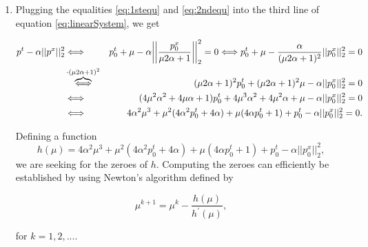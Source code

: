         \begin{enumerate}
            \item Plugging the equalities \ref{eq:1stequ} and \ref{eq:2ndequ} into the third line of equation \ref{eq:linearSystem}, we get

        \begin{eqnarray}
            p^{t} - \alpha||p^{x}||_{2}^{2} &\Longleftrightarrow& p_{0}^{t} + \mu - \alpha \bigg|\bigg|\frac{p_{0}^{x}}{\mu 2 \alpha + 1}\bigg|\bigg|_{2}^{2} = 0 \Longleftrightarrow p_{0}^{t} + \mu - \frac{\alpha}{(\mu 2 \alpha + 1)^{2}} ||p_{0}^{x}||_{2}^{2} = 0 \notag \\
            &\overbrace{\Longleftrightarrow}^{\cdot (\mu2\alpha + 1)^{2}}& (\mu 2 \alpha + 1)^{2} p_{0}^{t} + (\mu 2 \alpha + 1)^{2} \mu - \alpha ||p_{0}^{x}||_{2}^{2} = 0 \notag \\
            &\Longleftrightarrow& (4 \mu^{2} \alpha^{2} + 4 \mu \alpha + 1) p_{0}^{t} + 4 \mu^{3} \alpha^{2} + 4 \mu^{2} \alpha + \mu - \alpha ||p_{0}^{x}||_{2}^{2} = 0 \notag \\
            &\Longleftrightarrow& 4 \alpha^{2} \mu^{3} + \mu^{2} (4 \alpha^{2} p_{0}^{t} + 4 \alpha) + \mu (4 \alpha p_{0}^{t} + 1) + p_{0}^{t} - \alpha ||p_{0}^{x}||_{2}^{2} = 0. \notag
        \end{eqnarray}

        Defining a function
            $$
                h(\mu) = 4 \alpha^{2} \mu^{3} + \mu^{2} (4 \alpha^{2} p_{0}^{t} + 4 \alpha) + \mu (4 \alpha p_{0}^{t} + 1) + p_{0}^{t} - \alpha ||p_{0}^{x}||_{2}^{2},
            $$
        we are seeking for the zeroes of $h$. Computing the zeroes can efficiently be established by using Newton's algorithm defined by

        \begin{equation}
            \mu^{k+1} = \mu^{k} - \frac{h(\mu)}{h^{'}(\mu)}, \label{eq:newton}
        \end{equation}

        for $k = 1, 2, ...$.


\end{enumerate}
